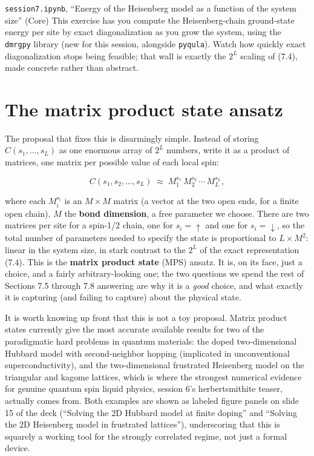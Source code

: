 \begin{notebookbox}{\texttt{session7.ipynb}, ``Energy of the Heisenberg model as a function of the system size'' (Core)}
This exercise has you compute the Heisenberg-chain ground-state energy per site by exact
diagonalization as you grow the system, using the \texttt{dmrgpy} library (new for this session, alongside
\texttt{pyqula}). Watch how quickly exact diagonalization stops being feasible; that wall is exactly the
$2^L$ scaling of (7.4), made concrete rather than abstract.
\end{notebookbox}

\section{The matrix product state ansatz}

The proposal that fixes this is disarmingly simple. Instead of storing $C(s_1,\dots,s_L)$ as one
enormous array of $2^L$ numbers, write it as a product of matrices, one matrix per possible value of
each local spin:

\begin{equation}
C(s_1,s_2,\dots,s_L) \;\approx\; M^{s_1}_{1}\, M^{s_2}_{2}\, \cdots\, M^{s_L}_{L},
\end{equation}

where each $M^{s_i}_i$ is an $M\times M$ matrix (a vector at the two open ends, for a finite open
chain), $M$ the \textbf{bond dimension}, a free parameter we choose. There are two matrices per site for a
spin-1/2 chain, one for $s_i=\uparrow$ and one for $s_i=\downarrow$, so the total number of parameters
needed to specify the state is proportional to $L\times M^2$: linear in the system size, in stark
contrast to the $2^L$ of the exact representation (7.4). This is the \textbf{matrix product state} (MPS)
ansatz. It is, on its face, just a choice, and a fairly arbitrary-looking one; the two questions we
spend the rest of Sections 7.5 through 7.8 answering are why it is a \emph{good} choice, and what exactly it
is capturing (and failing to capture) about the physical state.

It is worth knowing up front that this is not a toy proposal. Matrix product states currently give the
most accurate available results for two of the paradigmatic hard problems in quantum materials: the
doped two-dimensional Hubbard model with second-neighbor hopping (implicated in unconventional
superconductivity), and the two-dimensional frustrated Heisenberg model on the triangular and kagome
lattices, which is where the strongest numerical evidence for genuine quantum spin liquid physics,
session 6's herbertsmithite teaser, actually comes from. Both examples are shown as labeled figure
panels on slide 15 of the deck (``Solving the 2D Hubbard model at finite doping'' and ``Solving the 2D
Heisenberg model in frustrated lattices''), underscoring that this is squarely a working tool for the
strongly correlated regime, not just a formal device.

